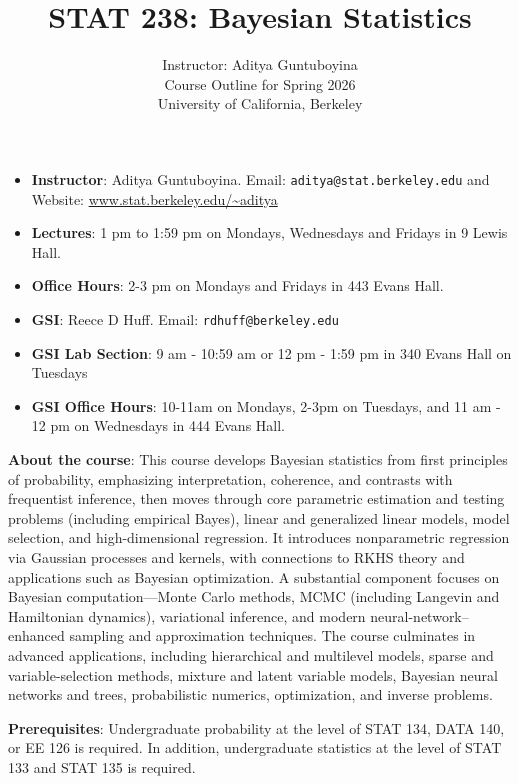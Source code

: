 \documentclass[12pt,oneside]{amsart}
\begin{document}
\title{STAT 238: Bayesian Statistics}
\author{Instructor: Aditya Guntuboyina \\ Course Outline for Spring
  2026 \\ University of California, Berkeley}  

\maketitle

\begin{itemize}
\item \textbf{Instructor}: Aditya Guntuboyina. Email:
  \texttt{aditya@stat.berkeley.edu} and Website: 
  \url{www.stat.berkeley.edu/~aditya}
\item \textbf{Lectures}: 1 pm to 1:59 pm on Mondays, Wednesdays and
  Fridays in 9 Lewis Hall. 
\item \textbf{Office Hours}: 2-3 pm on Mondays and
  Fridays in 443 Evans Hall. 
\item \textbf{GSI}: Reece D Huff. Email: \texttt{rdhuff@berkeley.edu}
\item \textbf{GSI Lab Section}: 9 am - 10:59 am  or 12 pm -
  1:59 pm in 340 Evans Hall on Tuesdays  
\item \textbf{GSI Office Hours}: 10-11am on Mondays, 2-3pm on Tuesdays, and 11 am - 12 pm
  on Wednesdays in 444 Evans Hall.
\end{itemize}

\noindent \textbf{About the course}: This course develops Bayesian
statistics from first principles of probability, emphasizing
interpretation, coherence, and contrasts with frequentist inference,
then moves through core parametric estimation and testing problems
(including empirical Bayes), linear and generalized linear models,
model selection, and high-dimensional regression. It introduces
nonparametric regression via Gaussian processes and kernels, with
connections to RKHS theory and applications such as Bayesian
optimization. A substantial component focuses on Bayesian
computation—Monte Carlo methods, MCMC (including Langevin and
Hamiltonian dynamics), variational inference, and modern
neural-network–enhanced sampling and approximation techniques. The
course culminates in advanced applications, including hierarchical and
multilevel models, sparse and variable-selection methods, mixture and
latent variable models, Bayesian neural networks and trees,
probabilistic numerics, optimization, and inverse problems. 

\noindent \textbf{Prerequisites}: Undergraduate probability at the
level of STAT 134, DATA 140, or EE 126 is required. In addition,
undergraduate statistics at the level of STAT 133 and STAT 135 is
required. 
\end{document}
